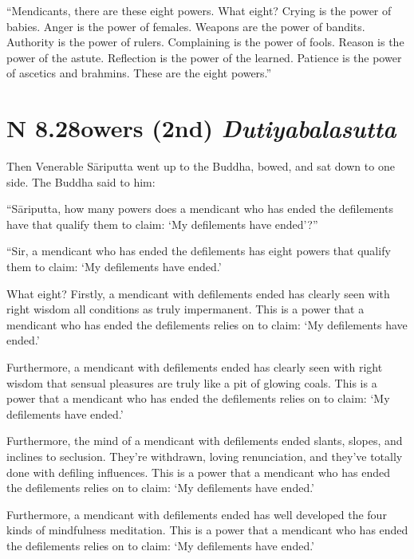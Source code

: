 \documentclass[12pt,openany]{book}%
\newcommand*{\suttatitleacronym}[1]{\smaller[2]{#1}\vspace*{.3em}}
\newcommand*{\suttatitletranslation}[1]{\linebreak{#1}}
\newcommand*{\suttatitleroot}[1]{\linebreak\smaller[2]\itshape{#1}}
\newcommand*{\tocacronym}[1]{\hspace*{-3.3em}{#1}\quad}
\newcommand*{\toctranslation}[1]{#1}
\newcommand*{\tocroot}[1]{(\textit{#1})}
\begin{document}
“Mendicants, there are these eight powers. What eight? Crying is the power of babies. Anger is the power of females. Weapons are the power of bandits. Authority is the power of rulers. Complaining is the power of fools. Reason is the power of the astute. Reflection is the power of the learned. Patience is the power of ascetics and brahmins. These are the eight powers.” 

%
\section*{{\suttatitleacronym AN 8.28}{\suttatitletranslation Powers (2nd) }{\suttatitleroot Dutiyabalasutta}}
\addcontentsline{toc}{section}{\tocacronym{AN 8.28} \toctranslation{Powers (2nd) } \tocroot{Dutiyabalasutta}}

Then Venerable \textsanskrit{Sāriputta} went up to the Buddha, bowed, and sat down to one side. The Buddha said to him: 

“\textsanskrit{Sāriputta}, how many powers does a mendicant who has ended the defilements have that qualify them to claim: ‘My defilements have ended’?” 

“Sir, a mendicant who has ended the defilements has eight powers that qualify them to claim: ‘My defilements have ended.’ 

What eight? Firstly, a mendicant with defilements ended has clearly seen with right wisdom all conditions as truly impermanent. This is a power that a mendicant who has ended the defilements relies on to claim: ‘My defilements have ended.’ 

Furthermore, a mendicant with defilements ended has clearly seen with right wisdom that sensual pleasures are truly like a pit of glowing coals. This is a power that a mendicant who has ended the defilements relies on to claim: ‘My defilements have ended.’ 

Furthermore, the mind of a mendicant with defilements ended slants, slopes, and inclines to seclusion. They’re withdrawn, loving renunciation, and they’ve totally done with defiling influences. This is a power that a mendicant who has ended the defilements relies on to claim: ‘My defilements have ended.’ 

Furthermore, a mendicant with defilements ended has well developed the four kinds of mindfulness meditation. This is a power that a mendicant who has ended the defilements relies on to claim: ‘My defilements have ended.’ 
\end{document}
